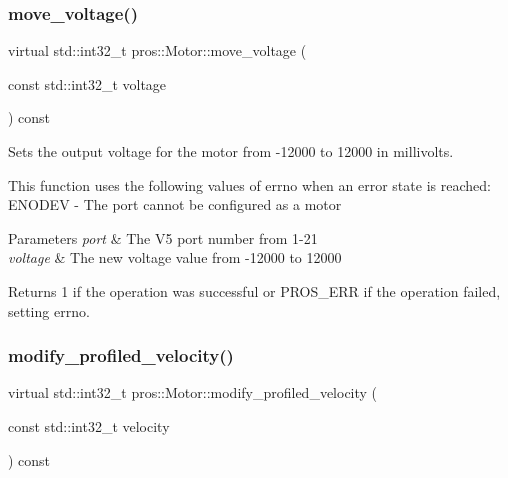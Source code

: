 \subsubsection{\texorpdfstring{move\+\_\+voltage()}{move\_voltage()}}
{\footnotesize\ttfamily virtual std\+::int32\+\_\+t pros\+::\+Motor\+::move\+\_\+voltage (\begin{DoxyParamCaption}\item[{const std\+::int32\+\_\+t}]{voltage }\end{DoxyParamCaption}) const\hspace{0.3cm}{\ttfamily [virtual]}}



Sets the output voltage for the motor from -\/12000 to 12000 in millivolts. 

This function uses the following values of errno when an error state is reached\+: E\+N\+O\+D\+EV -\/ The port cannot be configured as a motor


\begin{DoxyParams}{Parameters}
{\em port} & The V5 port number from 1-\/21 \\
\hline
{\em voltage} & The new voltage value from -\/12000 to 12000\\
\hline
\end{DoxyParams}
\begin{DoxyReturn}{Returns}
1 if the operation was successful or P\+R\+O\+S\+\_\+\+E\+RR if the operation failed, setting errno. 
\end{DoxyReturn}
\mbox{\label{classpros_1_1Motor_a44f39232cec1caee6d668d8ff21dc28b}} 
\subsubsection{\texorpdfstring{modify\+\_\+profiled\+\_\+velocity()}{modify\_profiled\_velocity()}}
{\footnotesize\ttfamily virtual std\+::int32\+\_\+t pros\+::\+Motor\+::modify\+\_\+profiled\+\_\+velocity (\begin{DoxyParamCaption}\item[{const std\+::int32\+\_\+t}]{velocity }\end{DoxyParamCaption}) const\hspace{0.3cm}{\ttfamily [virtual]}}



